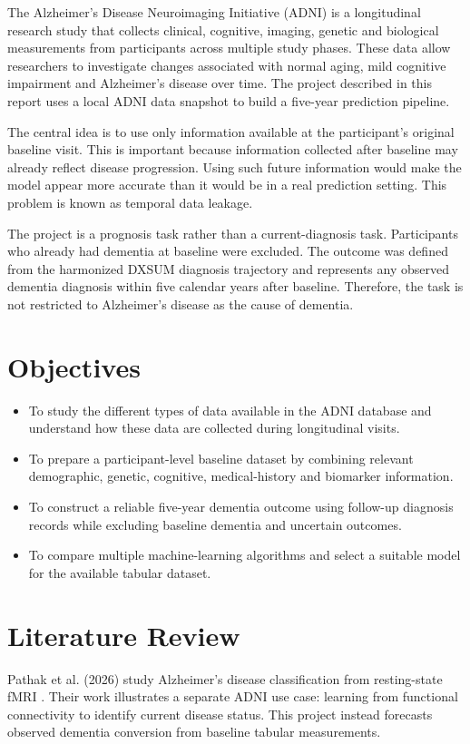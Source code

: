 \documentclass[11pt,a4paper]{article}
\begin{document}
The Alzheimer's Disease Neuroimaging Initiative (ADNI) is a longitudinal research study that collects clinical, cognitive, imaging, genetic and biological measurements from participants across multiple study phases. These data allow researchers to investigate changes associated with normal aging, mild cognitive impairment and Alzheimer's disease over time. The project described in this report uses a local ADNI data snapshot to build a five-year prediction pipeline.

The central idea is to use only information available at the participant's original baseline visit. This is important because information collected after baseline may already reflect disease progression. Using such future information would make the model appear more accurate than it would be in a real prediction setting. This problem is known as temporal data leakage.

The project is a prognosis task rather than a current-diagnosis task. Participants who already had dementia at baseline were excluded. The outcome was defined from the harmonized DXSUM diagnosis trajectory and represents any observed dementia diagnosis within five calendar years after baseline. Therefore, the task is not restricted to Alzheimer's disease as the cause of dementia.

\section{Objectives}
\begin{itemize}
\item To study the different types of data available in the ADNI database and understand how these data are collected during longitudinal visits.

\item To prepare a participant-level baseline dataset by combining relevant demographic, genetic, cognitive, medical-history and biomarker information.

\item To construct a reliable five-year dementia outcome using follow-up diagnosis records while excluding baseline dementia and uncertain outcomes.

\item To compare multiple machine-learning algorithms and select a suitable model for the available tabular dataset.

\end{itemize}
\section{Literature Review}
Pathak et al. (2026) study Alzheimer's disease classification from resting-state fMRI \cite{pathak}. Their work illustrates a separate ADNI use case: learning from functional connectivity to identify current disease status. This project instead forecasts observed dementia conversion from baseline tabular measurements.
\end{document}
